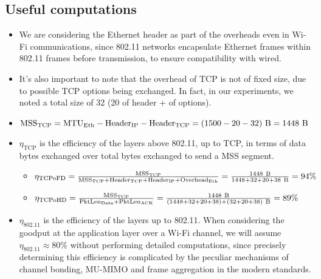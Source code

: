 \subsection{Useful computations}
\label{subsec:computations}
\begin{itemize}
    \item We are considering the Ethernet header as part of the overheads even in Wi-Fi communications, since 802.11 networks encapsulate Ethernet frames within 802.11 frames before transmission, to ensure compatibility with wired.
    \item It's also important to note that the overhead of TCP is not of fixed size, due to possible TCP options being exchanged. In fact, in our experiments, we noted a total size of 32  (20  of header +  of options).
    \item $\text{MSS}_{\text{TCP}}= \text{MTU}_{\text{Eth}}-\text{Header}_{\text{IP}}-\text{Header}_{\text{TCP}}= (1500 - 20 - 32)\ \text{B}= 1448\ \text{B}$
    \item $\eta_{\text{TCP}}$ is the efficiency of the layers above 802.11, up to TCP, in terms of data bytes exchanged over total bytes exchanged to send a MSS segment. 
    \begin{itemize}
        \item $\eta_{\text{TCPoFD}}= \frac{\text{MSS}_{\text{TCP}}}{\text{MSS}_{\text{TCP}} + \text{Header}_{\text{TCP}} + \text{Header}_{\text{IP}} + \text{Overhead}_{\text{Eth}}}\\ =\frac{1448\ \text{B}}{1448+32+20+38\ \text{B}} =94\%$
        \item $\eta_{\text{TCPoHD}}= \frac{\text{MSS}_{\text{TCP}}}{\text{PktLen}_{\text{Data}}+\text{PktLen}_{\text{ACK}}}
\\=\frac{1448\ \text{B}}{(1448+32+20+38)+(32+20+38)\ \text{B}}=89\%$
    \end{itemize}
    \item $\eta_{\text{802.11}}$ is the efficiency of the layers up to 802.11. When considering the goodput at the application layer over a Wi-Fi
channel, we will assume $\eta_{\text{802.11}}\approx 80\%$ without performing
detailed computations, since precisely determining this efficiency is complicated
by the peculiar mechanisms of channel bonding, MU-MIMO and frame
aggregation in the modern standards.
\end{itemize}